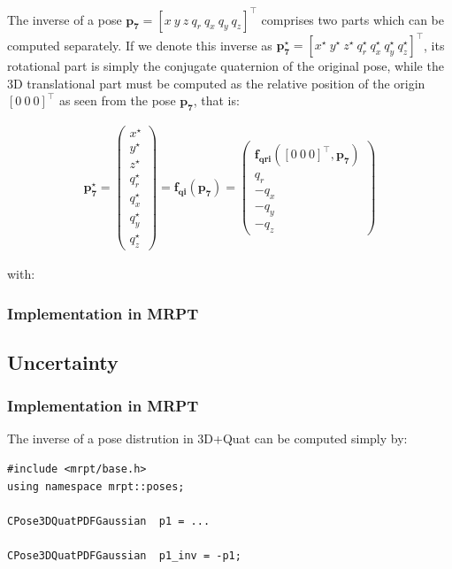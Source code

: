\documentclass[a4paper,10pt]{report}
\begin{document}
The inverse of a pose $\mathbf{p_7} = [x ~ y ~ z ~  q_r ~ q_x ~ q_y ~ q_z ] ^ \top$
comprises two parts which can be computed separately.
If we denote this inverse as $\mathbf{p^\star_7} = [x^\star ~ y^\star ~ z^\star ~  q^\star_r ~ q^\star_x ~ q^\star_y ~ q^\star_z ] ^ \top$,
its rotational part is simply the conjugate quaternion of the original pose, while the 3D translational
part must be computed as the relative position of the origin $[0 ~ 0 ~ 0]^\top$ as seen 
from the pose $\mathbf{p_7}$, that is:

\begin{eqnarray}
\mathbf{p^\star_7} = 
\left(
\begin{array}{c}
x^\star \\ y^\star \\ z^\star \\  q^\star_r \\ q^\star_x \\ q^\star_y \\ q^\star_z
\end{array}
\right) 
= 
\mathbf{f_{qi}}( \mathbf{p_7} ) 
=
\left(
\begin{array}{c}
\mathbf{f_{qri}}( [0 ~ 0 ~ 0]^\top, \mathbf{p_7} ) 
\\  q_r \\ -q_x \\ -q_y \\ -q_z
\end{array}
\right)
\end{eqnarray}

\noindent with:



\subsubsection{Implementation in MRPT}


\subsection{Uncertainty}



\subsubsection{Implementation in MRPT}

The inverse of a pose distrution in 3D+Quat can be computed simply by:

\begin{lstlisting}
#include <mrpt/base.h> 
using namespace mrpt::poses; 

CPose3DQuatPDFGaussian  p1 = ...

CPose3DQuatPDFGaussian  p1_inv = -p1;
\end{lstlisting}
\end{document}
